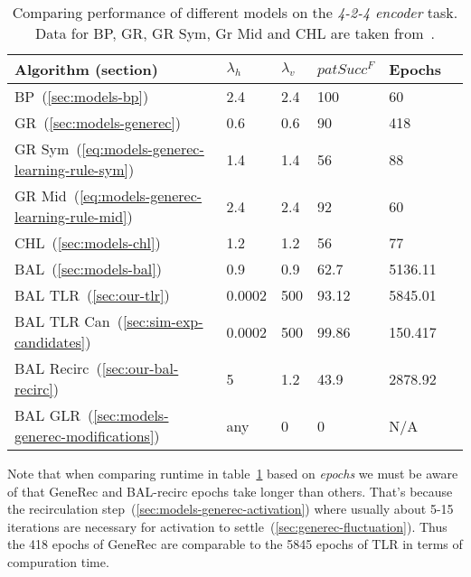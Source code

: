 \begin{table}[H] 
  \centering
    \begin{tabular}{|l|l|l|l|l|l|}
    \hline
    Algorithm (section)&$\lambda_h$&$\lambda_v$&$patSucc^F$ &Epochs\\ %
    \hline
    BP~(\ref{sec:models-bp}) &2.4 &2.4 &100&60\\ %
    \hline
    GR~(\ref{sec:models-generec}) &0.6 &0.6 &90&418\\ %
    \hline
    GR Sym~(\ref{eq:models-generec-learning-rule-sym}) &1.4 &1.4 &56&88\\ %
    \hline
    GR Mid~(\ref{eq:models-generec-learning-rule-mid}) &2.4 &2.4 &92&60\\ %
    \hline
    CHL~(\ref{sec:models-chl}) &1.2 &1.2 &56&77\\ %
    \hline
    BAL~(\ref{sec:models-bal})&0.9 &0.9 &62.7& 5136.11\\ %
    \hline
    BAL TLR~(\ref{sec:our-tlr})&0.0002  & 500&93.12&5845.01\\ %
    \hline
    BAL TLR Can~(\ref{sec:sim-exp-candidates})&0.0002&500&99.86&150.417\\ %
    \hline
    BAL Recirc~(\ref{sec:our-bal-recirc})&5&1.2&43.9&2878.92\\ %
    \hline
    BAL GLR~(\ref{sec:models-generec-modifications})& any & 0 & 0 & N/A \\ 
    \hline 
    \end{tabular}
  \caption{Comparing performance of different models on the \emph{4-2-4 encoder} task. Data for BP, GR, GR Sym, Gr Mid and CHL are taken from~\citet{o1996bio}.} 
  \label{tab:results-cmp-auto4}
\end{table}

Note that when comparing runtime in table~\ref{tab:results-cmp-auto4} based on \emph{epochs} we must be aware of that GeneRec and BAL-recirc epochs take longer than others. That's because the recirculation step~(\ref{sec:models-generec-activation}) where usually about 5-15 iterations are necessary for activation to settle~(\ref{sec:generec-fluctuation}). Thus the 418 epochs of GeneRec are comparable to the 5845 epochs of TLR in terms of compuration time. 
